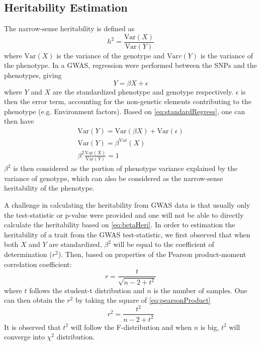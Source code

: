 		\subsection{Heritability Estimation}
			The narrow-sense heritability is defined as 
			$$
				h^2 = \frac{\mathrm{Var}(X)}{\mathrm{Var}(Y)}
			$$
			where $\mathrm{Var}(X)$ is the variance of the genotype and $\mathrm{Var}r(Y)$ is the variance of the phenotype.
			In a \gls{GWAS}, regression were performed between the \glspl{SNP} and the phenotypes, giving
			\begin{equation}
				Y=\beta X+\epsilon
				\label{eq:standardRegress}
			\end{equation}
			where $Y$ and $X$ are the standardized phenotype and genotype respectively. 
			$\epsilon$ is then the error term, accounting for the non-genetic elements contributing to the phenotype (e.g. Environment factors).
			Based on \cref{eq:standardRegress}, one can then have
			\begin{align}
				\mathrm{Var}(Y) = \mathrm{Var}(\beta X)+ \mathrm{Var}(\epsilon) \nonumber\\
				\mathrm{Var}(Y) = \beta^\mathrm{Var}(X) \nonumber\\
				\beta^2\frac{\mathrm{Var}(X)}{\mathrm{Var}(Y)}= 1
				\label{eq:betaHeri}
			\end{align}
			$\beta^2$ is then considered as the portion of phenotype variance explained by the variance of genotype, which can also be considered as the narrow-sense heritability of the phenotype.
					
			A challenge in calculating the heritability from \gls{GWAS} data is that usually only the test-statistic or p-value were provided and one will not be able to directly calculate the heritability based on \cref{eq:betaHeri}. In order to estimation the heritability of a trait from the \gls{GWAS} test-statistic, we first observed that when both $X$ and $Y$ are standardized, $\beta^2$ will be equal to the coefficient of determination ($r^2$). Then, based on properties of the Pearson product-moment correlation coefficient:
			\begin{equation}
				r = \frac{t}{\sqrt{n-2+t^2}}
				\label{eq:pearsonProduct}
			\end{equation}
			where $t$ follows the student-t distribution and $n$ is the number of samples.
			One can then obtain the $r^2$ by taking the square of \cref{eq:pearsonProduct}
			\begin{equation}
				r^2 = \frac{t^2}{n-2+t^2}
				\label{eq:oriRSquared}
			\end{equation}
			It is observed that $t^2$ will follow the F-distribution and when $n$ is big, $t^2$ will converge into $\chi^2$ distribution.
			
